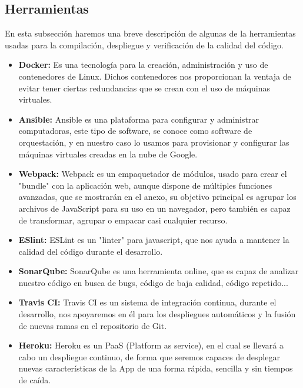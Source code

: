 \subsection {Herramientas}
En esta subsección haremos una breve descripción de algunas de la herramientas usadas para la compilación, despliegue y verificación de la calidad del código.
\begin{itemize}
  \item \textbf{Docker:} Es una tecnología para la creación, administración y uso de contenedores de Linux. Dichos contenedores nos proporcionan la ventaja de evitar tener ciertas redundancias que se crean con el uso de máquinas virtuales.
  
  \item \textbf{Ansible:} Ansible es una plataforma para configurar y administrar computadoras, este tipo de software, se conoce como software de orquestación, y en nuestro caso lo usamos para provisionar y configurar las máquinas virtuales creadas en la nube de Google.
  
  \item \textbf{Webpack:} Webpack es un empaquetador de módulos, usado para crear el "bundle" con la aplicación web, aunque dispone de múltiples funciones avanzadas, que se mostrarán en el anexo, su objetivo principal es agrupar los archivos de JavaScript para su uso en un navegador, pero también es capaz de transformar, agrupar o empacar casi cualquier recurso.
  
  \item \textbf{ESlint:} ESLint es un "linter" para javascript, que nos ayuda a mantener la calidad del código durante el desarrollo.
  
  \item \textbf{SonarQube:} SonarQube es una herramienta online, que es capaz de analizar nuestro código en busca de bugs, código de baja calidad, código repetido...
  
  \item \textbf{Travis CI:} Travis CI es un sistema de integración continua, durante el desarrollo, nos apoyaremos en él para los despliegues automáticos y la fusión de nuevas ramas en el repositorio de Git.
  
  \item \textbf{Heroku:} Heroku es un PaaS (Platform as service), en el cual se llevará a cabo un despliegue continuo, de forma que seremos capaces de desplegar nuevas características de la App de una forma rápida, sencilla y sin tiempos de caída.
  

\end{itemize}
